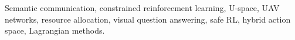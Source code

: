 \documentclass[journal]{IEEEtran}
\begin{document}
\begin{IEEEkeywords}
Semantic communication, constrained reinforcement learning, U-space,
UAV networks, resource allocation, visual question answering, safe RL,
hybrid action space, Lagrangian methods.
\end{IEEEkeywords}












\end{document}
